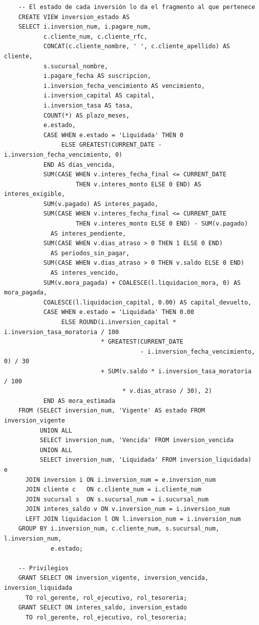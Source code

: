 \begin{verbatim}
	-- El estado de cada inversión lo da el fragmento al que pertenece
	CREATE VIEW inversion_estado AS
	SELECT i.inversion_num, i.pagare_num,
	       c.cliente_num, c.cliente_rfc,
	       CONCAT(c.cliente_nombre, ' ', c.cliente_apellido) AS cliente,
	       s.sucursal_nombre,
	       i.pagare_fecha AS suscripcion,
	       i.inversion_fecha_vencimiento AS vencimiento,
	       i.inversion_capital AS capital,
	       i.inversion_tasa AS tasa,
	       COUNT(*) AS plazo_meses,
	       e.estado,
	       CASE WHEN e.estado = 'Liquidada' THEN 0
	            ELSE GREATEST(CURRENT_DATE - i.inversion_fecha_vencimiento, 0)
	       END AS dias_vencida,
	       SUM(CASE WHEN v.interes_fecha_final <= CURRENT_DATE
	                THEN v.interes_monto ELSE 0 END) AS interes_exigible,
	       SUM(v.pagado) AS interes_pagado,
	       SUM(CASE WHEN v.interes_fecha_final <= CURRENT_DATE
	                THEN v.interes_monto ELSE 0 END) - SUM(v.pagado)
	         AS interes_pendiente,
	       SUM(CASE WHEN v.dias_atraso > 0 THEN 1 ELSE 0 END)
	         AS periodos_sin_pagar,
	       SUM(CASE WHEN v.dias_atraso > 0 THEN v.saldo ELSE 0 END)
	         AS interes_vencido,
	       SUM(v.mora_pagada) + COALESCE(l.liquidacion_mora, 0) AS mora_pagada,
	       COALESCE(l.liquidacion_capital, 0.00) AS capital_devuelto,
	       CASE WHEN e.estado = 'Liquidada' THEN 0.00
	            ELSE ROUND(i.inversion_capital * i.inversion_tasa_moratoria / 100
	                       * GREATEST(CURRENT_DATE
	                                  - i.inversion_fecha_vencimiento, 0) / 30
	                       + SUM(v.saldo * i.inversion_tasa_moratoria / 100
	                             * v.dias_atraso / 30), 2)
	       END AS mora_estimada
	FROM (SELECT inversion_num, 'Vigente' AS estado FROM inversion_vigente
	      UNION ALL
	      SELECT inversion_num, 'Vencida' FROM inversion_vencida
	      UNION ALL
	      SELECT inversion_num, 'Liquidada' FROM inversion_liquidada) e
	  JOIN inversion i ON i.inversion_num = e.inversion_num
	  JOIN cliente c   ON c.cliente_num = i.cliente_num
	  JOIN sucursal s  ON s.sucursal_num = i.sucursal_num
	  JOIN interes_saldo v ON v.inversion_num = i.inversion_num
	  LEFT JOIN liquidacion l ON l.inversion_num = i.inversion_num
	GROUP BY i.inversion_num, c.cliente_num, s.sucursal_num, l.inversion_num,
	         e.estado;

	-- Privilegios
	GRANT SELECT ON inversion_vigente, inversion_vencida, inversion_liquidada
	  TO rol_gerente, rol_ejecutivo, rol_tesoreria;
	GRANT SELECT ON interes_saldo, inversion_estado
	  TO rol_gerente, rol_ejecutivo, rol_tesoreria;
\end{verbatim}

